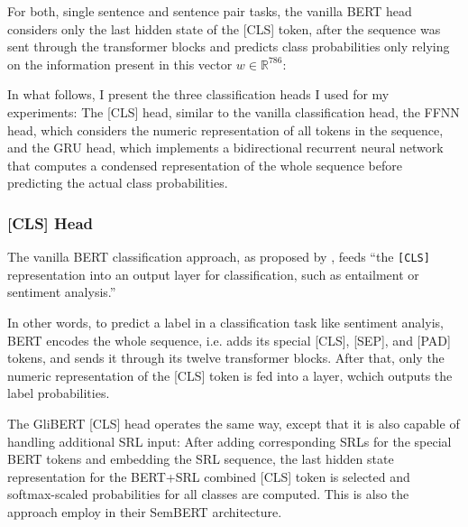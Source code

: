 For both, single sentence and sentence pair tasks, the vanilla BERT head considers
only the last hidden state of the [CLS] token, after the sequence was sent through
the transformer blocks and predicts class probabilities only relying on the
information present in this vector $w \in \mathbb{R}^{786}$:

In what follows, I present the three classification heads I used for my experiments: The
[CLS] head, similar to the vanilla classification head, the FFNN head, which considers the
numeric representation of all tokens in the sequence, and the GRU head, which implements
a bidirectional recurrent neural network that computes a condensed representation of the
whole sequence before predicting the actual class probabilities.



\subsubsection{[CLS] Head}

The vanilla BERT classification approach, as proposed by \cite{devlin2018bert}, feeds
``the \texttt{[CLS]} representation \textelp{} into an output layer for classification,
such as entailment or sentiment analysis.''

In other words, to predict a label in a classification task like sentiment analyis, BERT
encodes the whole sequence, i.e. adds its special [CLS], [SEP], and [PAD] tokens, and
sends it through its twelve transformer blocks. After that, only the numeric representation
of the [CLS] token is fed into a layer, wchich outputs the label probabilities.

The GliBERT [CLS] head operates the same way, except that it is also capable of
handling additional SRL input: After adding corresponding SRLs for the special BERT
tokens and embedding the SRL sequence, the last hidden state representation for the
BERT+SRL combined [CLS] token is selected and softmax-scaled probabilities for all
classes are computed. This is also the approach \cite{zhang2019semantics} employ in
their SemBERT architecture.



